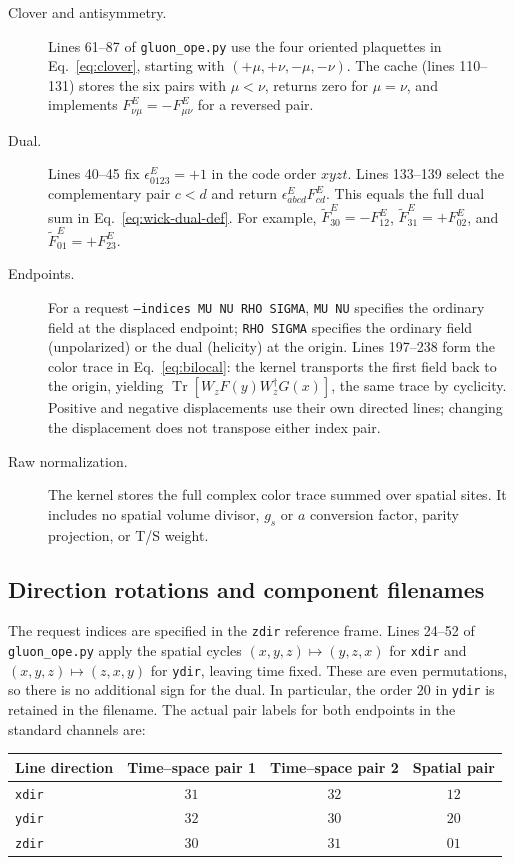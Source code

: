 \documentclass[11pt,a4paper]{article}
\DeclareMathOperator{\Tr}{Tr}
\begin{document}
\begin{description}
\item[Clover and antisymmetry.] Lines 61--87 of \nolinkurl{gluon_ope.py}
use the four oriented plaquettes in Eq.~\eqref{eq:clover}, starting with
\((+\mu,+\nu,-\mu,-\nu)\). The cache (lines 110--131) stores the six pairs
with \(\mu<\nu\), returns zero for \(\mu=\nu\), and implements
\(F^E_{\nu\mu}=-F^E_{\mu\nu}\) for a reversed pair.
\item[Dual.] Lines 40--45 fix \(\epsilon^E_{0123}=+1\) in the code order
\(xyzt\). Lines 133--139 select the complementary pair \(c<d\) and return
\(\epsilon^E_{abcd}F^E_{cd}\). This equals the full dual sum in
Eq.~\eqref{eq:wick-dual-def}. For example,
\(\widetilde F^E_{30}=-F^E_{12}\),
\(\widetilde F^E_{31}=+F^E_{02}\), and
\(\widetilde F^E_{01}=+F^E_{23}\).
\item[Endpoints.] For a request \texttt{--indices MU NU RHO SIGMA},
\texttt{MU NU} specifies the ordinary field at the displaced endpoint;
\texttt{RHO SIGMA} specifies the ordinary field (unpolarized) or the dual
(helicity) at the origin. Lines 197--238 form the color trace in
Eq.~\eqref{eq:bilocal}: the kernel transports the first field back to
the origin, yielding \(\Tr[W_z F(y)W_z^\dagger G(x)]\), the same trace by
cyclicity. Positive and negative displacements use their own directed
lines; changing the displacement does not transpose either index pair.
\item[Raw normalization.] The kernel stores the full complex color trace
summed over spatial sites. It includes no spatial volume divisor,
\(g_s\) or \(a\) conversion factor, parity projection, or T/S weight.
\end{description}

\subsection{Direction rotations and component filenames}
The request indices are specified in the \texttt{zdir} reference frame.
Lines 24--52 of \nolinkurl{gluon_ope.py} apply the spatial cycles
\((x,y,z)\mapsto(y,z,x)\) for \texttt{xdir} and
\((x,y,z)\mapsto(z,x,y)\) for \texttt{ydir}, leaving time fixed. These are
even permutations, so there is no additional sign for the dual. In
particular, the order \(20\) in \texttt{ydir} is retained in the filename.
The actual pair labels for both endpoints in the standard channels are:
\begin{center}
\begin{tabular}{lccc}
\toprule
Line direction & Time--space pair 1 & Time--space pair 2 & Spatial pair \\
\midrule
\texttt{xdir} & \(31\) & \(32\) & \(12\) \\
\texttt{ydir} & \(32\) & \(30\) & \(20\) \\
\texttt{zdir} & \(30\) & \(31\) & \(01\) \\
\bottomrule
\end{tabular}
\end{center}
\end{document}
